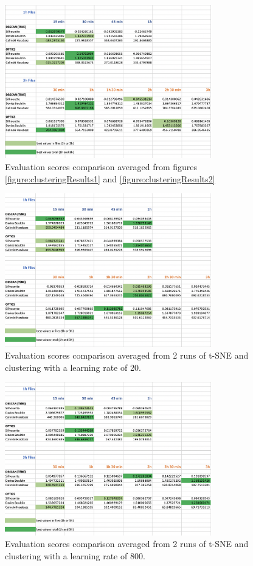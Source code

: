 \begin{figure}
  \centering
  \includegraphics[width=0.8\textwidth]{./images/clusteringResults/clusteringResults3.png}
  \caption{Evaluation scores comparison averaged from figures \ref{figure:clusteringResults1} and \ref{figure:clusteringResults2}}
  \label{figure:clusteringResults3}
\end{figure}

\begin{figure}
  \centering
  \includegraphics[width=0.8\textwidth]{./images/clusteringResults/clusteringResults4.png}
  \caption{Evaluation scores comparison averaged from 2 runs of t-SNE and clustering with a learning rate of 20.}
  \label{figure:clusteringResults4}
\end{figure}

\begin{figure}
  \centering
  \includegraphics[width=0.8\textwidth]{./images/clusteringResults/clusteringResults5.png}
  \caption{Evaluation scores comparison averaged from 2 runs of t-SNE and clustering with a learning rate of 800.}
  \label{figure:clusteringResults5}
\end{figure}